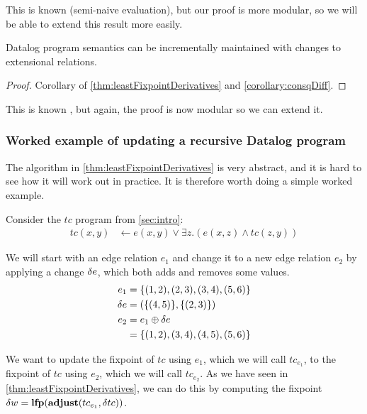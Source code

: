 This is known (semi-naive evaluation), but our proof is more
modular, so we will be able to extend this result more easily.

\begin{corollary}
\label{thm:diffUpdate}
  Datalog program semantics can be incrementally maintained with changes to
  extensional relations.
\end{corollary}
\ifproofs
\begin{proof}
  Corollary of \cref{thm:leastFixpointDerivatives} and \cref{corollary:consqDiff}.
\end{proof}
\fi

This is known \autocite[see][and successors]{gupta1993maintaining},
but again, the proof is now modular so we can extend it.

\subsubsection{Worked example of updating a recursive Datalog program}
\label{sec:workedExample}

The algorithm in \cref{thm:leastFixpointDerivatives} is very abstract, and it is
hard to see how it will work out in practice. It is therefore worth doing a
simple worked example.


Consider the $tc$ program from \cref{sec:intro}:
\begin{align*}
  tc(x, y) &\leftarrow e(x, y) \vee \exists z.(e(x, z) \wedge tc(z, y))
\end{align*}

We will start with an edge relation $e_1$ and change it to a new edge relation
$e_2$ by applying a change $\delta e$, which both adds and removes some values.
\begin{align*}
  e_1 &= \{(1,2), (2,3), (3,4), (5,6) \}\\
  \delta e &= (\{(4,5)\}, \{(2,3)\})\\
  e_2 &= e_1 \oplus \delta e\\
      &=\{ (1,2), (3,4), (4,5), (5,6) \}
\end{align*}

We want to update the fixpoint of $tc$ using $e_1$, which we will call
$tc_{e_1}$,  to the fixpoint of $tc$ using $e_2$, which we will call $tc_{e_2}$.
As we have seen in \cref{thm:leastFixpointDerivatives},
we can do this by computing the fixpoint $\delta w = \mathbf{lfp}(\mathbf{adjust}(tc_{e_1}, \delta tc))$. 

